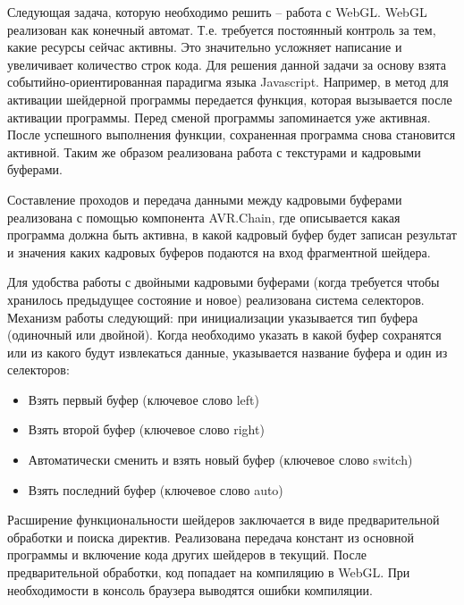 
Следующая задача, которую необходимо решить -- работа с WebGL. WebGL реализован как конечный
автомат. Т.е. требуется постоянный контроль за тем, какие ресурсы сейчас активны. Это
значительно усложняет написание и увеличивает количество строк кода. Для решения данной задачи
за основу взята событийно-ориентированная парадигма языка Javascript. 
Например, в метод для активации шейдерной программы передается функция, которая
вызывается после активации программы. Перед сменой программы запоминается уже активная. 
После успешного выполнения функции, сохраненная программа снова становится активной.
Таким же образом реализована работа с текстурами и кадровыми буферами.

Составление проходов и передача данными между кадровыми буферами реализована с помощью
компонента AVR.Chain, где описывается какая программа должна быть активна, в какой
кадровый буфер будет записан результат и значения каких кадровых буферов подаются на вход
фрагментной шейдера.

Для удобства работы с двойными кадровыми буферами (когда требуется чтобы хранилось предыдущее
состояние и новое) реализована система селекторов. Механизм работы следующий: при инициализации
указывается тип буфера (одиночный или двойной). Когда необходимо указать в какой буфер сохранятся 
или из какого будут извлекаться данные, указывается название буфера и один из селекторов:

\begin{itemize}
  \item Взять первый буфер (ключевое слово left)
  \item Взять второй буфер (ключевое слово right)
  \item Автоматически сменить и взять новый буфер (ключевое слово switch)
  \item Взять последний буфер (ключевое слово auto)
\end{itemize}

Расширение функциональности шейдеров заключается в виде предварительной обработки
и поиска директив. Реализована передача констант из основной программы и включение
кода других шейдеров в текущий. После предварительной обработки, код попадает на компиляцию
в WebGL. При необходимости в консоль браузера выводятся ошибки компиляции.

